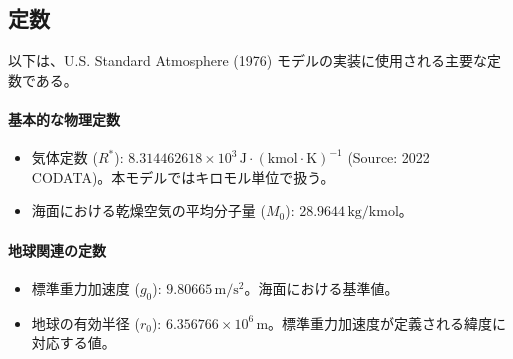 \documentclass[a4paper,12pt]{article}
\begin{document}
\subsection{定数}
以下は、U.S. Standard Atmosphere (1976) モデルの実装に使用される主要な定数である。

\paragraph{基本的な物理定数}
\begin{itemize}
    \item 気体定数 ($R^*$): $8.314462618 \times 10^{3} \, \mathrm{J \cdot (kmol \cdot K)^{-1}}$ (Source: 2022 CODATA)。本モデルではキロモル単位で扱う。
    \item 海面における乾燥空気の平均分子量 ($M_0$): $28.9644 \, \mathrm{kg/kmol}$。
\end{itemize}

\paragraph{地球関連の定数}
\begin{itemize}
    \item 標準重力加速度 ($g_0$): $9.80665 \, \mathrm{m/s^2}$。海面における基準値。
    \item 地球の有効半径 ($r_0$): $6.356766 \times 10^6 \, \mathrm{m}$。標準重力加速度が定義される緯度に対応する値。
\end{itemize}
\end{document}
